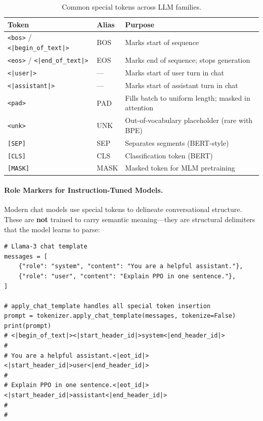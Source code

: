 \begin{table}[ht!]
\centering
\caption{Common special tokens across LLM families.}
\begin{tabular}{@{}lll@{}}
\toprule
\textbf{Token} & \textbf{Alias} & \textbf{Purpose} \\
\midrule
\texttt{<bos>} / \texttt{<|begin\_of\_text|>} & BOS & Marks start of sequence \\
\texttt{<eos>} / \texttt{<|end\_of\_text|>} & EOS & Marks end of sequence; stops generation \\
\texttt{<|user|>} & --- & Marks start of user turn in chat \\
\texttt{<|assistant|>} & --- & Marks start of assistant turn in chat \\
\texttt{<pad>} & PAD & Fills batch to uniform length; masked in attention \\
\texttt{<unk>} & UNK & Out-of-vocabulary placeholder (rare with BPE) \\
\texttt{[SEP]} & SEP & Separates segments (BERT-style) \\
\texttt{[CLS]} & CLS & Classification token (BERT) \\
\texttt{[MASK]} & MASK & Masked token for MLM pretraining \\
\bottomrule
\end{tabular}
\end{table}

\paragraph{Role Markers for Instruction-Tuned Models.}
\label{role-markers-for-instruction-tuned-models.}

Modern chat models use special tokens to delineate conversational structure. These are \textbf{not} trained to carry semantic meaning---they are structural delimiters that the model learns to parse:

\begin{lstlisting}[style=pythonstyle, caption={Chat template with special tokens (Llama-3 format).}]
# Llama-3 chat template
messages = [
    {"role": "system", "content": "You are a helpful assistant."},
    {"role": "user", "content": "Explain PPO in one sentence."},
]

# apply_chat_template handles all special token insertion
prompt = tokenizer.apply_chat_template(messages, tokenize=False)
print(prompt)
# <|begin_of_text|><|start_header_id|>system<|end_header_id|>
#
# You are a helpful assistant.<|eot_id|><|start_header_id|>user<|end_header_id|>
#
# Explain PPO in one sentence.<|eot_id|><|start_header_id|>assistant<|end_header_id|>
#
#
\end{lstlisting}

